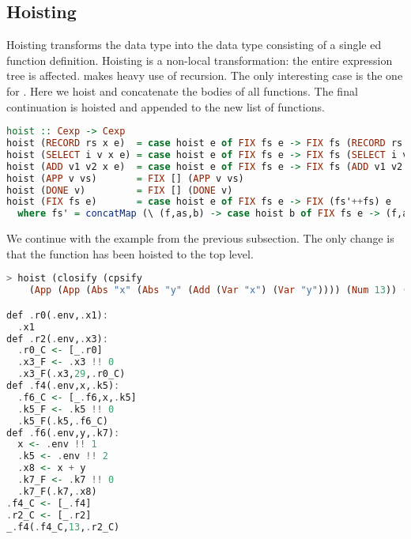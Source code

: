 {\subsection{\label{subsection:hoist}Hoisting}
Hoisting transforms the  data type into the  data type consisting of a single ed function definition. Hoisting is a non-local transformation: the entire expression tree is affected.  makes heavy use of recursion. The only interesting case is the one for . Here we hoist and concatenate the bodies of all functions. The final continuation  is hoisted and appended to the new list of functions.

\begin{lstlisting}[language=Haskell]
hoist :: Cexp -> Cexp
hoist (RECORD rs x e)  = case hoist e of FIX fs e -> FIX fs (RECORD rs x e)
hoist (SELECT i v x e) = case hoist e of FIX fs e -> FIX fs (SELECT i v x e)
hoist (ADD v1 v2 x e)  = case hoist e of FIX fs e -> FIX fs (ADD v1 v2 x e)
hoist (APP v vs)       = FIX [] (APP v vs)
hoist (DONE v)         = FIX [] (DONE v)               
hoist (FIX fs e)       = case hoist e of FIX fs e -> FIX (fs'++fs) e
  where fs' = concatMap (\ (f,as,b) -> case hoist b of FIX fs e -> (f,as,e) : fs) fs
\end{lstlisting}

We continue with the example from the previous subsection. The only change is that the function  has been hoisted to the top level.

\begin{lstlisting}[language=Haskell]
> hoist (closify (cpsify
    (App (App (Abs "x" (Abs "y" (Add (Var "x") (Var "y")))) (Num 13)) (Num 29))))

def .r0(.env,.x1):
  .x1
def .r2(.env,.x3):
  .r0_C <- [_.r0]
  .x3_F <- .x3 !! 0
  .x3_F(.x3,29,.r0_C)
def .f4(.env,x,.k5):
  .f6_C <- [_.f6,x,.k5]
  .k5_F <- .k5 !! 0
  .k5_F(.k5,.f6_C)
def .f6(.env,y,.k7):
  x <- .env !! 1
  .k5 <- .env !! 2
  .x8 <- x + y
  .k7_F <- .k7 !! 0
  .k7_F(.k7,.x8)
.f4_C <- [_.f4]
.r2_C <- [_.r2]
_.f4(.f4_C,13,.r2_C)
\end{lstlisting}

}
